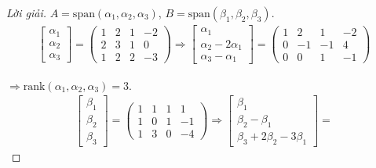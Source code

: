 \documentclass[class=linear-algebra,crop=false]{standalone}
\begin{document}
\begin{proof}[Lời giải]$A = \text{span}(\alpha_{1},\alpha_{2},\alpha_{3})$, $B = \text{span}(\beta_{1},\beta_{2},\beta_{3})$.
    \begin{align*}
        \begin{bmatrix}
            \alpha_{1} \\
            \alpha_{2} \\
            \alpha_{3}
        \end{bmatrix}=
        \begin{pmatrix}
            1 & 2 & 1 & -2 \\
            2 & 3 & 1 & 0  \\
            1 & 2 & 2 & -3
        \end{pmatrix}
        \Longrightarrow
        \begin{bmatrix}
            \alpha_{1}               \\
            \alpha_{2} - 2\alpha_{1} \\
            \alpha_{3} - \alpha_{1}
        \end{bmatrix}=
        \begin{pmatrix}
            1 & 2  & 1  & -2 \\
            0 & -1 & -1 & 4  \\
            0 & 0  & 1  & -1
        \end{pmatrix}
    \end{align*}
    \par $\Rightarrow\text{rank}(\alpha_{1}, \alpha_{2}, \alpha_{3}) = 3$.
    \begin{align*}
        \begin{bmatrix}
            \beta_{1} \\
            \beta_{2} \\
            \beta_{3}
        \end{bmatrix}=
        \begin{pmatrix}
            1 & 1 & 1 & 1  \\
            1 & 0 & 1 & -1 \\
            1 & 3 & 0 & -4
        \end{pmatrix}
        \Longrightarrow
        \begin{bmatrix}
            \beta_{1}             \\
            \beta_{2} - \beta_{1} \\
            \beta_{3} + 2\beta_{2} - 3\beta_{1}
        \end{bmatrix}=

\end{align*}
\end{proof}
\end{document}
